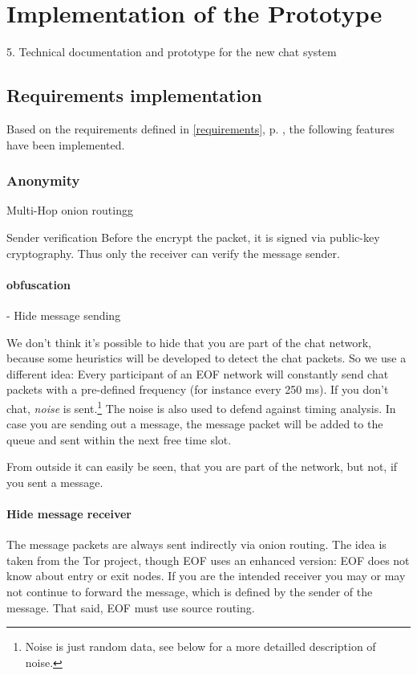 \chapter{Implementation of the Prototype}

5. Technical documentation and prototype for the new chat system


\section{Requirements implementation}
Based on the requirements defined in \ref{requirements}, 
p. \pageref{requirements}, the following features have been implemented. 

\subsection{Anonymity}
Multi-Hop onion routingg

Sender verification
Before the encrypt the packet, it is signed via public-key
cryptography\cite{pgp-1}. Thus only the receiver can verify the message sender.

\subsubsection{obfuscation}
- Hide message sending 

We don't think it's possible to hide that you are part of the chat network,
because some heuristics will be developed to detect the chat packets.
So we use a different idea:
Every participant of an EOF network will constantly send chat packets
with a pre-defined frequency (for instance every 250 ms). 
If you don't chat, \emph{noise} is sent.\footnote{Noise is just random
data, see below for a more detailled description of noise.}
The noise is also used to defend against timing analysis.
In case you are sending out a message, the message packet will be added to the
queue and sent within the next free time slot.

From outside it can easily be seen, that you are part of the network,
but not, if you sent a message.

\subsubsection{Hide message receiver}
The message packets are always sent indirectly via onion routing\cite{onion-1}.
The idea is taken from the Tor project\cite{tor-1}, though EOF uses an enhanced
version: EOF does not know about entry or exit nodes. If you are the intended
receiver you may or may not continue to forward the message, which is defined
by the sender of the message. That said, EOF must use source 
routing\cite{source-routing-1}.

